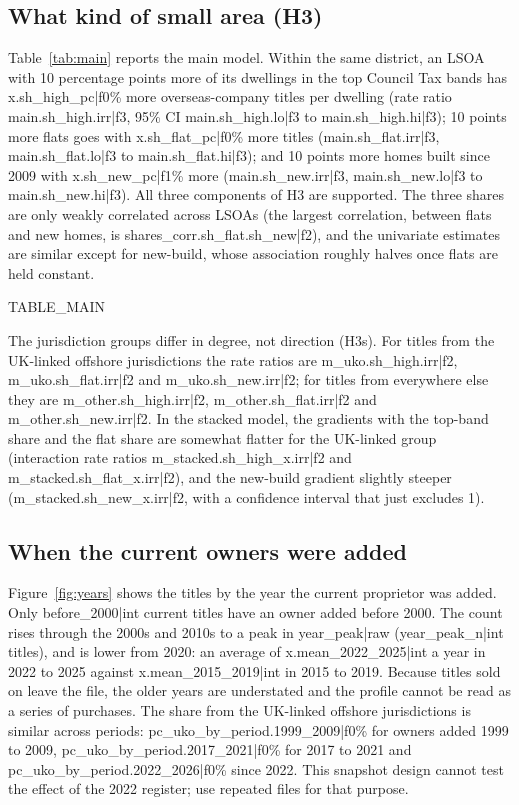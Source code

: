 \documentclass[11pt,a4paper]{article}
\begin{document}
\subsection{What kind of small area (H3)}
Table~\ref{tab:main} reports the main model. Within the same district, an LSOA with 10 percentage points more of its dwellings in the top Council Tax bands has {{x.sh_high_pc|f0}}\% more overseas-company titles per dwelling (rate ratio {{main.sh_high.irr|f3}}, 95\% CI {{main.sh_high.lo|f3}} to {{main.sh_high.hi|f3}}); 10 points more flats goes with {{x.sh_flat_pc|f0}}\% more titles ({{main.sh_flat.irr|f3}}, {{main.sh_flat.lo|f3}} to {{main.sh_flat.hi|f3}}); and 10 points more homes built since 2009 with {{x.sh_new_pc|f1}}\% more ({{main.sh_new.irr|f3}}, {{main.sh_new.lo|f3}} to {{main.sh_new.hi|f3}}). All three components of H3 are supported. The three shares are only weakly correlated across LSOAs (the largest correlation, between flats and new homes, is {{shares_corr.sh_flat.sh_new|f2}}), and the univariate estimates are similar except for new-build, whose association roughly halves once flats are held constant.

{{TABLE_MAIN}}

The jurisdiction groups differ in degree, not direction (H3s). For titles from the UK-linked offshore jurisdictions the rate ratios are {{m_uko.sh_high.irr|f2}}, {{m_uko.sh_flat.irr|f2}} and {{m_uko.sh_new.irr|f2}}; for titles from everywhere else they are {{m_other.sh_high.irr|f2}}, {{m_other.sh_flat.irr|f2}} and {{m_other.sh_new.irr|f2}}. In the stacked model, the gradients with the top-band share and the flat share are somewhat flatter for the UK-linked group (interaction rate ratios {{m_stacked.sh_high_x.irr|f2}} and {{m_stacked.sh_flat_x.irr|f2}}), and the new-build gradient slightly steeper ({{m_stacked.sh_new_x.irr|f2}}, with a confidence interval that just excludes 1).

\subsection{When the current owners were added}
Figure~\ref{fig:years} shows the titles by the year the current proprietor was added. Only {{before_2000|int}} current titles have an owner added before 2000. The count rises through the 2000s and 2010s to a peak in {{year_peak|raw}} ({{year_peak_n|int}} titles), and is lower from 2020: an average of {{x.mean_2022_2025|int}} a year in 2022 to 2025 against {{x.mean_2015_2019|int}} in 2015 to 2019. Because titles sold on leave the file, the older years are understated and the profile cannot be read as a series of purchases. The share from the UK-linked offshore jurisdictions is similar across periods: {{pc_uko_by_period.1999_2009|f0}}\% for owners added 1999 to 2009, {{pc_uko_by_period.2017_2021|f0}}\% for 2017 to 2021 and {{pc_uko_by_period.2022_2026|f0}}\% since 2022. This snapshot design cannot test the effect of the 2022 register; \citet{collin2025} use repeated files for that purpose.
\end{document}
